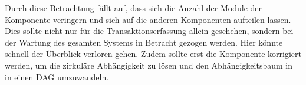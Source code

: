 Durch diese Betrachtung fällt auf, dass sich die Anzahl der Module der Komponente  veringern und sich auf die anderen Komponenten aufteilen lassen. Dies sollte nicht nur für die Transaktionserfassung allein geschehen, sondern bei der Wartung des gesamten Systems in Betracht gezogen werden. Hier könnte schnell der Überblick verloren gehen. Zudem sollte erst die Komponente  korrigiert werden, um die zirkuläre Abhängigkeit zu lösen und den Abhängigkeitsbaum in  in einen \ac{DAG} umzuwandeln.
